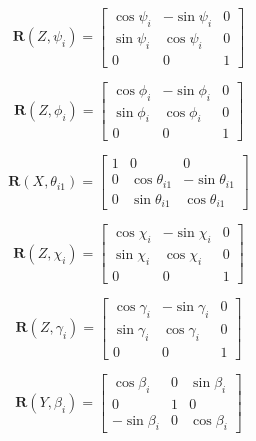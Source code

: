 \documentclass[titlepage, letterpaper, fleqn]{article}
\let\bs\mathbf
\begin{document}
\begin{equation}
    \label{eq:rot_Z_psi}
    \bs{R}(Z,\psi_i) =
    \begin{bmatrix}
        \cos\psi_i & -\sin\psi_i & 0 \\
        \sin\psi_i & \cos\psi_i & 0 \\
        0 & 0 & 1
    \end{bmatrix}
\end{equation}

\begin{equation}
    \label{eq:rot_Z_phi}
    \bs{R}(Z,\phi_i) =
    \begin{bmatrix}
        \cos\phi_i & -\sin\phi_i & 0 \\
        \sin\phi_i & \cos\phi_i & 0 \\
        0 & 0 & 1
    \end{bmatrix}
\end{equation}

\begin{equation}
    \label{eq:rot_X_theta}
    \bs{R}(X,\theta_{i1}) =
    \begin{bmatrix}
        1 & 0 & 0 \\
        0 & \cos\theta_{i1} & -\sin\theta_{i1} \\
        0 & \sin\theta_{i1} & \cos\theta_{i1}
    \end{bmatrix}
\end{equation}

\begin{equation}
    \label{eq:rot_Z_chi}
    \bs{R}(Z,\chi_i) =
    \begin{bmatrix}
    \cos\chi_i & -\sin\chi_i & 0 \\
    \sin\chi_i & \cos\chi_i & 0 \\
    0 & 0 & 1
    \end{bmatrix}
\end{equation}

\begin{equation}
    \label{eq:rot_Z_gamma}
    \bs{R}(Z,\gamma_i) = 
    \begin{bmatrix}
    \cos\gamma_i & -\sin\gamma_i & 0 \\
    \sin\gamma_i & \cos\gamma_i & 0 \\
    0 & 0 & 1
    \end{bmatrix}
\end{equation}

\begin{equation}
    \label{eq:rot_Y_beta}
    \bs{R}(Y,\beta_i) =
    \begin{bmatrix}
    \cos\beta_i & 0 & \sin\beta_i \\
    0 & 1 & 0 \\
    -\sin\beta_i & 0 &\cos\beta_i
    \end{bmatrix}
\end{equation}
\end{document}
